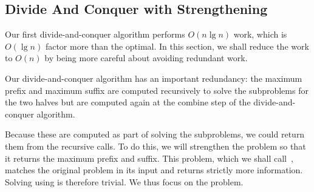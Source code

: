 \subsection{Divide And Conquer with Strengthening}

\begin{gram}
Our first divide-and-conquer algorithm performs $O(n \lg n)$ work,
which is $O(\lg{n})$ factor more than the optimal.
%
In this section, we shall reduce the work to $O(n)$ by being more
careful about avoiding redundant work.
%
%
\end{gram}





\begin{gram}[Intuition]
Our divide-and-conquer algorithm has an important redundancy: the
maximum prefix and maximum suffix are computed recursively to solve
the subproblems for the two halves but are computed again at the
combine step of the divide-and-conquer algorithm.
%

Because these are computed as part of solving the subproblems, we
could return them from the recursive calls.  
%
To do this, we will strengthen the problem so that it returns the
maximum prefix and suffix.  
%
This problem, which we shall call~, matches the
original \MCSS{} problem in its input and returns strictly more
information.
% 
Solving \MCSS{} using \MCSSPS{} is therefore trivial.  
%
We thus focus on the \MCSSPS{} problem.
\end{gram}

%

